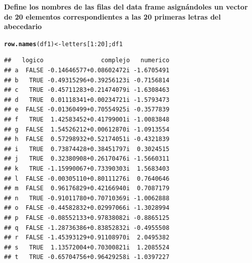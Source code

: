\documentclass[12pt,letterpaper]{article}\usepackage[]{graphicx}\usepackage[]{color}
\makeatletter
\newcommand{\hlnum}[1]{\textcolor[rgb]{0.686,0.059,0.569}{#1}}%
\newcommand{\hlopt}[1]{\textcolor[rgb]{0,0,0}{#1}}%
\newcommand{\hlstd}[1]{\textcolor[rgb]{0.345,0.345,0.345}{#1}}%
\newcommand{\hlkwb}[1]{\textcolor[rgb]{0.69,0.353,0.396}{#1}}%
\newcommand{\hlkwd}[1]{\textcolor[rgb]{0.737,0.353,0.396}{\textbf{#1}}}%
\newenvironment{kframe}{%
 \def\at@end@of@kframe{}%
 \ifinner\ifhmode%
  \def\at@end@of@kframe{\end{minipage}}%
  \begin{minipage}{\columnwidth}%
 \fi\fi%
 \def\FrameCommand##1{\hskip\@totalleftmargin \hskip-\fboxsep
 \colorbox{shadecolor}{##1}\hskip-\fboxsep
     \hskip-\linewidth \hskip-\@totalleftmargin \hskip\columnwidth}%
 \MakeFramed {\advance\hsize-\width
   \@totalleftmargin\z@ \linewidth\hsize
   \@setminipage}}%
 {\par\unskip\endMakeFramed%
 \at@end@of@kframe}
\newenvironment{knitrout}{}{} %
\makeatother
\begin{document}
\textbf{Define los nombres de las filas del data frame asign\'andoles un vector de 20 elementos correspondientes a las 20 primeras letras del abecedario}
\begin{knitrout}
\color{fgcolor}\begin{kframe}
\begin{alltt}
\hlkwd{row.names}\hlstd{(df1)} \hlkwb{<-} \hlstd{letters[}\hlnum{1}\hlopt{:}\hlnum{20}\hlstd{]; df1}
\end{alltt}
\begin{verbatim}
##   logico                complejo   numerico
## a  FALSE -0.14646577+0.08602472i -1.6705491
## b   TRUE -0.49315296+0.39256123i -0.7156814
## c   TRUE -0.45711283+0.21474079i -1.6308463
## d   TRUE  0.01118341+0.00234721i -1.5793473
## e  FALSE -0.01360499+0.70554925i -0.3577839
## f   TRUE  1.42583452+0.41799001i -1.0083848
## g  FALSE  1.54526212+0.00612870i -1.0913554
## h  FALSE  0.57298932+0.52174051i -0.4321839
## i   TRUE  0.73874428+0.38451797i  0.3024515
## j   TRUE  0.32380908+0.26170476i -1.5660311
## k   TRUE -1.15990067+0.73390303i  1.5683403
## l  FALSE -0.00305110+0.80111276i  0.7640646
## m  FALSE  0.96176829+0.42166940i  0.7087179
## n   TRUE -0.91011780+0.70710369i -1.0062888
## o  FALSE -0.44582832+0.02997066i -1.3028994
## p  FALSE -0.08552133+0.97838082i -0.8865125
## q  FALSE -1.28736386+0.83852832i -0.4955508
## r  FALSE -1.45393129+0.91108970i  2.0495382
## s   TRUE  1.13572004+0.70300821i  1.2085524
## t   TRUE -0.65704756+0.96429258i -1.0397227
\end{verbatim}
\end{kframe}
\end{knitrout}
\end{document}
